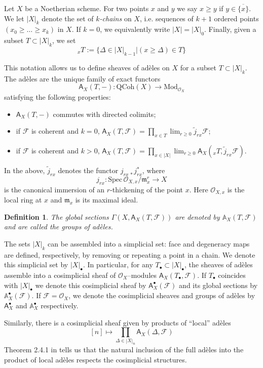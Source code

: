 \documentclass[11pt,letterpaper]{amsart}
\newtheorem{definition}[dummy]{Definition}
\newcommand{\bfA}{\mathsf{A}}
\newcommand{\bA}{\mathbb{A}}
\newcommand{\cF}{\mathcal{F}}
\newcommand{\cO}{\mathcal{O}}
\newcommand{\Spec}{\mathrm{S}\mathrm{pec}\,}
\newcommand{\Mod}{\mathrm{Mod}}
\newcommand{\QCoh}{\mathrm{QCoh}}
\begin{document}
Let $X$ be a Noetherian scheme. For two points $x$ and $y$ we say $x\geq y$ if $y\in\overline{\{x\}}$.
We let $|X|_k$ denote the set of \emph{$k$-chains} on $X$, i.e. sequences of $k+1$ ordered points $(x_0\geq\dots\geq x_k)$ in $X$. If $k=0$, we equivalently write $|X|=|X|_0$.
Finally, given a subset $T\subset|X|_k$, we set
$$_{x}T:=\{\Delta\in |X|_{k-1}|(x\geq \Delta)\in T\}$$

This notation allows us to define sheaves of ad\`eles on $X$ for a subset $T\subset|X|_{k}$. The ad\`eles are the unique family of exact functors $$\bfA_{X}(T,-):\QCoh(X)\to\Mod_{\cO_X}$$ satisfying the following properties:
\begin{itemize}
	\item $\bfA_{X}(T,-)$ commutes with directed colimits;
	\item if $\cF$ is coherent and $k=0$, $\bfA_{X}(T,\cF)=\prod_{x\in T}\lim_{r\geq 0}\tilde{j}_{rx}\cF$;
	\item if $\cF$ is coherent and $k>0$, $\bfA_{X}(T,\cF)=\prod_{x\in|X|}\lim_{r\geq 0}\bfA_{X}(_{x}T,\tilde{j}_{rx}\cF)$.
\end{itemize}

In the above, $\tilde{j}_{rx}$ denotes the functor $j_{rx\,\ast}j_{rx}^{\ast}$, where 
$$j_{rx}:\Spec \cO_{X,x}/\mathfrak{m}_x^r\to X$$
is the canonical immersion of an $r$-thickening of the point $x$. Here $\cO_{X,x}$ is the local ring at $x$ and $\mathfrak{m}_x$ is its maximal ideal.

\begin{definition}
The global sections $\Gamma(X, \bfA_{X}(T,\cF))$ are denoted by $\bA_{X}(T,\cF)$ and are called the groups of ad\`eles. 
\end{definition}

The sets $|X|_k$ can be assembled into a simplicial set: face and degeneracy maps are defined, respectively, by removing or repeating a point in a chain.  %
We denote this simplicial set  by $|X|_{\bullet}$. In particular,  for any $T_\bullet\subset|X|_\bullet$, the sheaves of ad\`eles assemble into a cosimplicial sheaf of $\cO_{X}$--modules $\bfA_{X}(T_\bullet,\cF)$. If $T_\bullet$ coincides with $|X|_\bullet$ we denote this cosimplicial sheaf by $\bfA_{X}^{\bullet}(\cF)$ and its global sections by $\bA_{X}^{\bullet}(\cF)$. If $\cF=\cO_X$, we denote the cosimplicial sheaves and groups of ad\`eles by $\bfA_{X}^{\bullet}$ and $\bA_{X}^{\bullet}$ respectively.

Similarly, there is a cosimplicial sheaf given by products of ``local'' ad\`eles
$$[n]\mapsto\prod_{\Delta\in|X|_n}\bfA_{X}(\Delta,\cF)$$
Theorem 2.4.1 in \cite{HubAd} tells us that the natural inclusion of the full ad\`eles into the product of local ad\`eles respects the cosimplicial structures.
\end{document}
